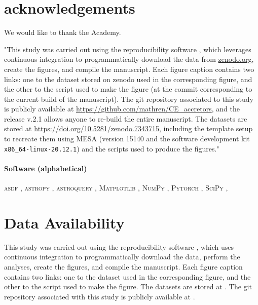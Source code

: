 \documentclass[twocolumn]{aastex631}
\newcommand{\package}[1]{\textsc{#1}}
\begin{document}


\section{acknowledgements}

    We would like to thank the Academy.

    "This study was carried out using the reproducibility software
    \href{https://github.com/showyourwork/showyourwork}{\showyourwork}
    \citep{Luger2021}, which leverages continuous integration to
    programmatically download the data from
    \href{https://zenodo.org/}{zenodo.org}, create the figures, and
    compile the manuscript. Each figure caption contains two links: one
    to the dataset stored on zenodo used in the corresponding figure,
    and the other to the script used to make the figure (at the commit
    corresponding to the current build of the manuscript). The git
    repository associated to this study is publicly available at
    \url{https://github.com/mathren/CE_accretors}, and the release
    v.2.1 allows anyone to re-build the entire manuscript. The datasets
    are stored at \url{https://doi.org/10.5281/zenodo.7343715}, including
    the template setup to recreate them using MESA (version 15140 and
    the software development kit \texttt{x86\_64-linux-20.12.1}) and
    the scripts used to produce the figures."

    \paragraph{Software (alphabetical)}

        \package{asdf} \citep{Greenfield2015},
        \package{astropy} \citep{Astropy2013, Astropy2018, Astropy2022},
        \package{astroquery} \citep{Astroquery2019},
        \package{Matplotlib} \citep{Hunter2007},
        \package{NumPy} \citep{Harris2020},
        \package{Pytorch} \citep{Pytorch2019},
        \package{SciPy} \citep{Scipy2020},


\section*{Data Availability} \label{sec:data_availability}

    This study was carried out using the reproducibility software
    \href{https://github.com/showyourwork/showyourwork}{\showyourwork}
    \citep{Luger2021}, which uses continuous integration to
    programmatically download the data, perform the analyses, create the
    figures, and compile the manuscript. Each figure caption contains two links:
    one to the dataset used in the corresponding figure, and the other to the
    script used to make the figure. The datasets are stored at
    . The git repository associated
    with this study is publicly available at .
\end{document}
